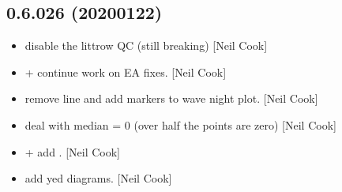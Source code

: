 \documentclass[a4paper,10pt,english]{report}
\begin{document}
\subsection{0.6.026 (2020\sphinxhyphen{}01\sphinxhyphen{}22)}
\label{\detokenize{misc/changelog:id11}}\begin{itemize}
\item {} 
 \sphinxhyphen{} disable the littrow QC (still breaking) {[}Neil
Cook{]}

\item {} 
 +  \sphinxhyphen{}
continue work on EA fixes. {[}Neil Cook{]}

\item {} 
 \sphinxhyphen{} remove line and add markers to wave night
plot. {[}Neil Cook{]}

\item {} 
 \sphinxhyphen{} deal with median = 0 (over half the points are
zero) {[}Neil Cook{]}

\item {} 
 +
 \sphinxhyphen{} add
. {[}Neil Cook{]}

\item {} 
 \sphinxhyphen{} add yed diagrams. {[}Neil Cook{]}

\end{itemize}
\end{document}
